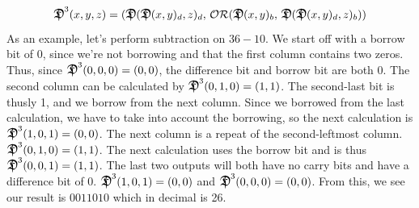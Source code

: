 \documentclass[oneside]{book}
\begin{document}
$$
\Sub^3(x,y,z) = (\Sub(\Sub(x,y)_d,z)_d,\, \mathcal{OR}(\Sub(x,y)_b,\,\Sub(\Sub(x,y)_d,z)_b))
$$
\tab
As an example, let's perform subtraction on $36-10$. We start off with a borrow bit of 0, since we're not borrowing and that the first column contains two zeros. Thus, since $\Sub^3(0,0,0) = (0,0)$, the difference bit and borrow bit are both 0. The second column can be calculated by $\Sub^3(0,1,0) = (1,1)$. The second-last bit is thusly 1, and we borrow from the next column. Since we borrowed from the last calculation, we have to take into account the borrowing, so the next calculation is $\Sub^3(1,0,1)=(0,0)$. The next column is a repeat of the second-leftmost column. $\Sub^3(0,1,0)=(1,1)$. The next calculation uses the borrow bit and is thus $\Sub^3(0,0,1)=(1,1)$. The last two outputs will both have no carry bits and have a difference bit of 0. $\Sub^3(1,0,1)=(0,0)$ and $\Sub^3(0,0,0)=(0,0)$. From this, we see our result is $0011010$ which in decimal is 26.
\end{document}
